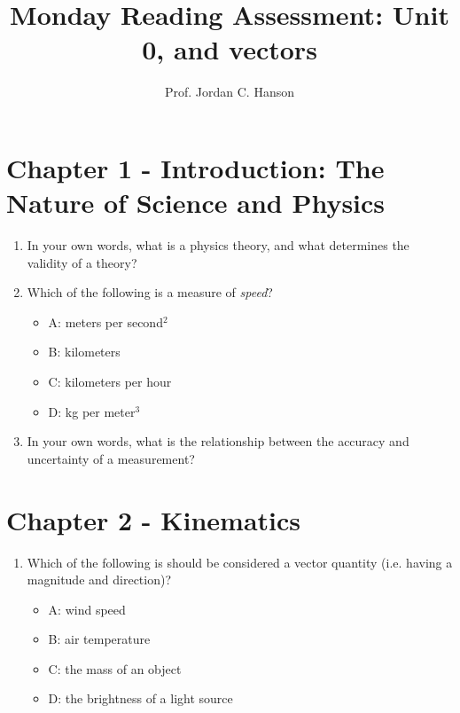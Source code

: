 \documentclass{article}
\begin{document}
\title{Monday Reading Assessment: Unit 0, and vectors}
\author{Prof. Jordan C. Hanson}

\maketitle

\section{Chapter 1 - Introduction: The Nature of Science and Physics}

\begin{enumerate}
\item In your own words, what is a physics theory, and what determines the validity of a theory? \\ \vspace{4cm}
\item Which of the following is a measure of \textit{speed}?
\begin{itemize}
\item A: meters per second$^2$
\item B: kilometers
\item C: kilometers per hour
\item D: kg per meter$^3$
\end{itemize} \vspace{2cm}
\item In your own words, what is the relationship between the accuracy and uncertainty of a measurement? \\ \vspace{4cm}
\end{enumerate}

\section{Chapter 2 - Kinematics}

\begin{enumerate}
\item Which of the following is should be considered a vector quantity (i.e. having a magnitude and direction)?
\begin{itemize}
\item A: wind speed
\item B: air temperature
\item C: the mass of an object
\item D: the brightness of a light source
\end{itemize} 
\end{enumerate}
\end{document}
